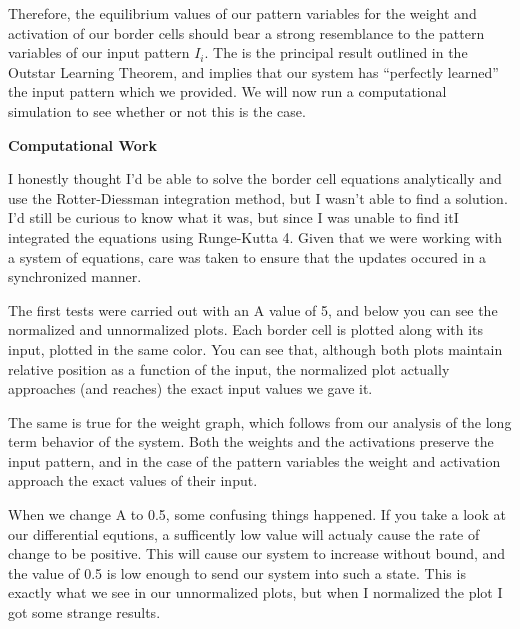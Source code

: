\documentclass[a4paper,12pt]{article}
\begin{document}
Therefore, the equilibrium values of our pattern variables for the weight and activation of our border cells should bear a strong resemblance to the pattern variables of our input pattern $I_i$. The is the principal result outlined in the Outstar Learning Theorem, and implies that our system has ``perfectly learned'' the input pattern which we provided. We will now run a computational simulation to see whether or not this is the case. 

\bigskip
{\bf Computational Work}
\bigskip

I honestly thought I'd be able to solve the border cell equations analytically and use the Rotter-Diessman integration method, but I wasn't able to find a solution. I'd still be curious to know what it was, but since I was unable to find itI integrated the equations using Runge-Kutta 4. Given that we were working with a system of equations, care was taken to ensure that the updates occured in a synchronized manner. 

\vspace{2mm}

The first tests were carried out with an A value of 5, and below you can see the normalized and unnormalized plots. Each border cell is plotted along with its input, plotted in the same color. You can see that, although both plots maintain relative position as a function of the input, the normalized plot actually approaches (and reaches) the exact input values we gave it. 

\vspace{2mm}

The same is true for the weight graph, which follows from our analysis of the long term behavior of the system. Both the weights and the activations preserve the input pattern, and in the case of the pattern variables the weight and activation approach the exact values of their input. 

\vspace{2mm}

When we change A to 0.5, some confusing things happened. If you take a look at our differential equtions, a sufficently low value will actualy cause the rate of change to be positive. This will cause our system to increase without bound, and the value of 0.5 is low enough to send our system into such a state. This is exactly what we see in our unnormalized plots, but when I normalized the plot I got some strange results. 

\vspace{2mm}
\end{document}
